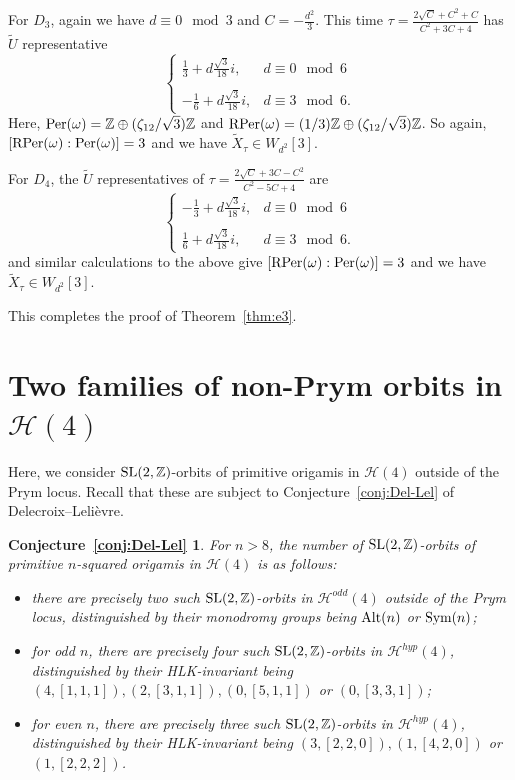 \documentclass[a4paper,11pt]{amsart}
\numberwithin{equation}{section}
\numberwithin{figure}{section}
\numberwithin{table}{section}
\newtheorem*{conjDelLel}{Conjecture~\ref*{conj:Del-Lel}}
\newcommand{\calH}{\mathcal{H}}
\newcommand{\odd}{\mathcal{H}^{odd}}
\newcommand{\hyp}{\mathcal{H}^{hyp}}
\newcommand{\Z}{\mathbb{Z}}
\DeclareMathOperator{\SL}{{\rm{SL}}}
\DeclareMathOperator{\Sym}{{\rm{Sym}}}
\DeclareMathOperator{\Alt}{{\rm{Alt}}}
\begin{document}
For $D_3$, again we have $d\equiv 0\!\!\mod 3$ and $C = -\frac{d^2}{3}$. This time $\tau = \frac{2\sqrt{C}+C^2+C}{C^2+3C+4}$ has $\widetilde{U}$ representative
\[\left\lbrace\begin{array}{cc}
    \frac{1}{3}+d\frac{\sqrt{3}}{18}i, & d\equiv0\!\!\mod 6 \\
    \\
    -\frac{1}{6}+d\frac{\sqrt{3}}{18}i, & d\equiv3\!\!\mod 6. 
\end{array}\right.\]
Here, ${\rm Per}(\omega) = \Z\oplus(\zeta_{12}/\sqrt{3})\Z$ and ${\rm RPer}(\omega) = (1/3)\Z\oplus(\zeta_{12}/\sqrt{3})\Z$. So again, $[{\rm RPer}(\omega):{\rm Per}(\omega)] = 3$ and we have $\widetilde{X}_{\tau}\in W_{d^2}[3]$.

For $D_4$, the $\widetilde{U}$ representatives of $\tau = \frac{2\sqrt{C}+3C-C^2}{C^2-5C+4}$ are 
\[\left\lbrace\begin{array}{cc}
    -\frac{1}{3}+d\frac{\sqrt{3}}{18}i, & d\equiv0\!\!\mod 6 \\
    \\
    \frac{1}{6}+d\frac{\sqrt{3}}{18}i, & d\equiv3\!\!\mod 6. 
\end{array}\right.\]
and similar calculations to the above give $[{\rm RPer}(\omega):{\rm Per}(\omega)] = 3$ and we have $\widetilde{X}_{\tau}\in W_{d^2}[3]$.

This completes the proof of Theorem~\ref{thm:e3}.


\section{Two families of non-Prym orbits in $\calH(4)$}\label{sec:non-prym}

Here, we consider $\SL(2,\Z)$-orbits of primitive origamis in $\calH(4)$ outside of the Prym locus. Recall that these are subject to Conjecture~\ref{conj:Del-Lel} of Delecroix--Leli\`evre.

\begin{conjDelLel}
    For $n > 8$, the number of $\SL(2,\Z)$-orbits of primitive $n$-squared origamis in $\calH(4)$ is as follows:
    \begin{itemize}
        \item there are precisely two such $\SL(2,\Z)$-orbits in $\odd(4)$ outside of the Prym locus, distinguished by their monodromy groups being $\Alt(n)$ or $\Sym(n)$;
        \item for odd $n$, there are precisely four such $\SL(2,\Z)$-orbits in $\hyp(4)$, distinguished by their HLK-invariant being $(4,[1,1,1]), (2,[3,1,1]), (0,[5,1,1])$ or $(0,[3,3,1])$;
        \item for even $n$, there are precisely three such $\SL(2,\Z)$-orbits in $\hyp(4)$, distinguished by their HLK-invariant being $(3,[2,2,0]), (1,[4,2,0])$ or $(1,[2,2,2])$.
    \end{itemize}    
\end{conjDelLel}
\end{document}
